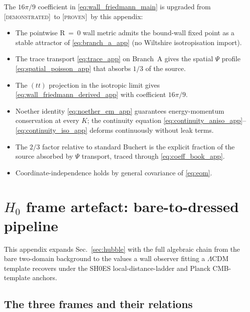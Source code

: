 \documentclass[aps,prd,twocolumn,nofootinbib,floatfix,superscriptaddress]{revtex4-2}
\newcommand{\PROVEN}{{\color{black!75!green}\textsc{[proven]}}}
\newcommand{\DEMO}{{\color{black!70!blue}\textsc{[demonstrated]}}}
\begin{document}
The $16\pi/9$ coefficient in \eqref{eq:wall_friedmann_main} is upgraded
from \DEMO\ to \PROVEN\ by this appendix:
\begin{itemize}
\item The pointwise R~=~0 wall metric admits the bound-wall fixed
point as a stable attractor of \eqref{eq:branch_a_app} (no Wiltshire
isotropisation import).
\item The trace transport \eqref{eq:trace_app} on Branch~A gives the
spatial $\Psi$ profile \eqref{eq:spatial_poisson_app} that absorbs
$1/3$ of the source.
\item The $(tt)$ projection in the isotropic limit gives
\eqref{eq:wall_friedmann_derived_app} with coefficient $16\pi/9$.
\item Noether identity \eqref{eq:noether_em_app} guarantees
energy-momentum conservation at every $K$; the continuity equation
\eqref{eq:continuity_aniso_app}--\eqref{eq:continuity_iso_app} deforms
continuously without leak terms.
\item The $2/3$ factor relative to standard Buchert is the explicit
fraction of the source absorbed by $\Psi$ transport, traced through
\eqref{eq:coeff_book_app}.
\item Coordinate-independence holds by general covariance of
\eqref{eq:eom}.
\end{itemize}

\section{$H_0$ frame artefact: bare-to-dressed pipeline}
\label{app:h0_frame}

This appendix expands Sec.~\ref{sec:hubble} with the full algebraic
chain from the bare two-domain background to the values a wall
observer fitting a $\Lambda$CDM template recovers under the SH0ES
local-distance-ladder and Planck CMB-template anchors.

\subsection{The three frames and their relations}
\end{document}
